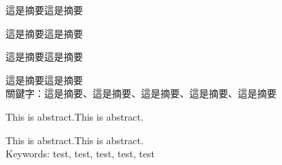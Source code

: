 \begin{abstractzh}
這是摘要這是摘要

這是摘要這是摘要

這是摘要這是摘要

這是摘要這是摘要\\
\newline
\noindent
關鍵字：這是摘要、這是摘要、這是摘要、這是摘要、這是摘要
\end{abstractzh}



\begin{abstracten}
This is abstract.This is abstract.

This is abstract.This is abstract.
\\

\noindent
Keywords: test, test, test, test, test
\end{abstracten}
